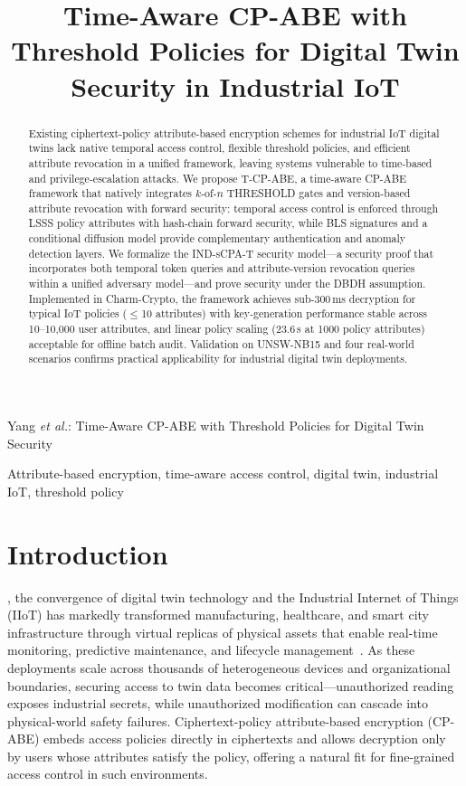 ﻿\documentclass[lettersize,journal]{IEEEtran}
\title{Time-Aware CP-ABE with Threshold Policies for Digital Twin Security in Industrial IoT}
\author{
\IEEEauthorblockN{Xinkai Yang$^{1}$ and He Xiao$^{1}$}
\IEEEauthorblockA{
$^{1}$School of Industrial Software,\\
Jiangxi University of Science and Technology,\\
Nanchang, China\\
Email: y13517096949@qq.com}
}
\begin{document}
%
{Yang \MakeLowercase{\textit{et al.}}: Time-Aware CP-ABE with Threshold Policies for Digital Twin Security}

\maketitle

\begin{abstract}
Existing ciphertext-policy attribute-based encryption schemes for industrial
IoT digital twins lack native temporal access control, flexible threshold
policies, and efficient attribute revocation in a unified framework, leaving
systems vulnerable to time-based and privilege-escalation attacks.
We propose T-CP-ABE, a time-aware CP-ABE framework that natively integrates
$k$-of-$n$ THRESHOLD gates and version-based attribute revocation with
forward security: temporal access control is enforced through LSSS policy
attributes with hash-chain forward security, while BLS signatures and a
conditional diffusion model provide complementary authentication and
anomaly detection layers.
We formalize the IND-sCPA-T security model---a security proof that
incorporates both temporal token queries and
attribute-version revocation queries within a unified adversary
model---and prove security under the DBDH assumption.
Implemented in Charm-Crypto, the framework achieves sub-300\,ms decryption
for typical IoT policies ($\leq$10 attributes) with key-generation
performance stable across 10--10,000 user attributes, and linear policy
scaling (23.6\,s at 1000 policy attributes) acceptable for offline batch
audit. Validation on UNSW-NB15 and four real-world
scenarios confirms practical applicability for industrial digital twin
deployments.
\end{abstract}

\begin{IEEEkeywords}
Attribute-based encryption, time-aware access control, digital twin, industrial IoT, threshold policy
\end{IEEEkeywords}

\section{Introduction}
\label{sec:introduction}

, the convergence of digital twin technology and the Industrial
Internet of Things (IIoT) has markedly transformed manufacturing, healthcare,
and smart city infrastructure through virtual replicas of physical assets that
enable real-time monitoring, predictive maintenance, and lifecycle
management~\cite{Sharma2022, LiuM2021, Fuller2020_DT_Survey}. As these
deployments scale across thousands of heterogeneous devices and organizational
boundaries, securing access to twin data becomes critical---unauthorized
reading exposes industrial secrets, while unauthorized modification can
cascade into physical-world safety failures. Ciphertext-policy attribute-based
encryption (CP-ABE) embeds access policies
directly in ciphertexts and allows decryption only by users whose attributes
satisfy the policy, offering a natural fit for fine-grained access control in
such environments.
\end{document}

